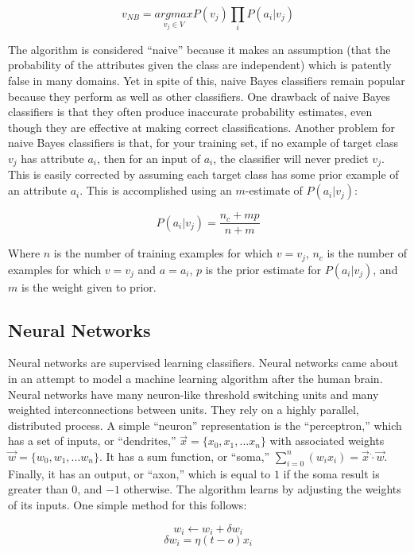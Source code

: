 \[v_{NB}=\underset{v_j \in V}{argmax}P(v_j)\prod_{i}P(a_i|v_j)\]

The algorithm is considered ``naive'' because it makes an assumption (that the probability of the attributes given the class are independent) which is patently false in many domains. Yet in spite of this, naive Bayes classifiers remain popular because they perform as well as other classifiers. One drawback of naive Bayes classifiers is that they often produce inaccurate probability estimates, even though they are effective at making correct classifications. Another problem for naive Bayes classifiers is that, for your training set, if no example of target class \(v_j\) has attribute \(a_i\), then for an input of \(a_i\), the classifier will never predict \(v_j\). This is easily corrected by assuming each target class has some prior example of an attribute \(a_i\). This is accomplished using an \(m\)-estimate of \(P(a_i|v_j)\):

\[P(a_i|v_j) = \frac{n_c+mp}{n+m}\]

Where \(n\) is the number of training examples for which \(v=v_j\), \(n_c\) is the number of examples for which \(v=v_j\) and \(a=a_i\), \(p\) is the prior estimate for \(P(a_i|v_j)\), and \(m\) is the weight given to prior. \cite{website:domingos} 


\subsection{Neural Networks}

Neural networks are supervised learning classifiers. Neural networks came about in an attempt to model a machine learning algorithm after the human brain. Neural networks have many neuron-like threshold switching units and many weighted interconnections between units. They rely on a highly parallel, distributed process. \cite{website:domingos} A simple ``neuron'' representation is the ``perceptron,'' which has a set of inputs, or ``dendrites,'' \(\vec{x}=\{x_0, x_1, ... x_n\}\) with associated weights \(\vec{w}=\{w_0, w_1, ... w_n\}\). It has a sum function, or ``soma,'' \(\sum_{i=0}^{n}(w_ix_i)=\vec{x}\dot\cdot\vec{w}\). Finally, it has an output, or ``axon,'' which is equal to \(1\) if the soma result is greater than \(0\), and \(-1\) otherwise. The algorithm learns by adjusting the weights of its inputs. One simple method for this follows:

\[w_i \leftarrow w_i + \delta w_i\]
\[\delta w_i = \eta (t - o) x_i\]

